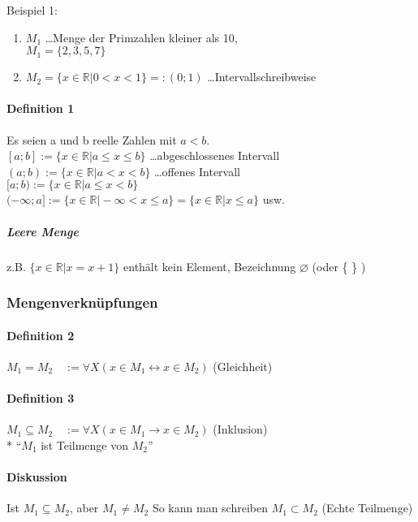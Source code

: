 \documentclass[a4paper]{scrartcl}
\begin{document}
Beispiel 1: 
\begin{enumerate}
\item $M_1$ \dots Menge der Primzahlen kleiner als 10, \\
$M_1 = \{ 2,3,5,7\}$
\item $M_2 = \{ x \in \mathbb{R} \vert 0 < x < 1\} =: (0;1)$ \dots Intervallschreibweise
\end{enumerate}
\paragraph{Definition 1}
Es seien a und b reelle Zahlen mit $a < b$. \\
$[a;b] :=\{ x \in \mathbb{R} \vert a \leq x \leq b\}$ \dots abgeschlossenes Intervall\\
$(a;b) :=\{ x \in \mathbb{R} \vert a < x < b\}$ \dots offenes Intervall\\
$[a;b) :=\{ x \in \mathbb{R} \vert a \leq x < b\}$\\
$(-\infty ; a] := \{ x \in \mathbb{R} \vert -\infty < x \leq a \} = \{ x \in \mathbb{R} \vert x \leq a \}$ usw.

\subparagraph{Leere Menge}
z.B. $ \{ x \in \mathbb{R} \vert x=x+1\}$ enthält kein Element, Bezeichnung $\varnothing $ (oder \{ \} )



\subsubsection{Mengenverknüpfungen}
\paragraph{Definition 2}
$M_1 = M_2 \quad := \forall X (x \in M_1 \leftrightarrow x \in M_2)$ (Gleichheit)
\paragraph{Definition 3}
$M_1 \subseteq M_2 \quad := \forall X ( x\in M_1 \rightarrow x \in M_2)$ (Inklusion)\\*
"`$M_1$ ist Teilmenge von $M_2$"'
\paragraph{Diskussion}
Ist $M_1 \subseteq M_2$, aber $M_1 \neq M_2$ So kann man schreiben $M_1 \subset M_2$ (Echte Teilmenge)
\end{document}
